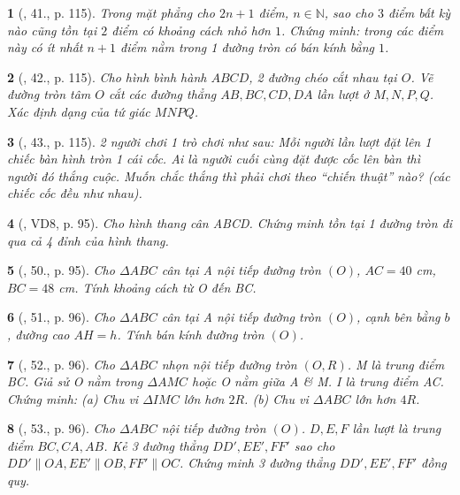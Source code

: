 \documentclass{article}
\newtheorem{baitoan}{}
\begin{document}
\begin{baitoan}[\cite{Tuyen_Toan_9_old}, 41., p. 115]
	Trong mặt phẳng cho $2n + 1$ điểm, $n\in\mathbb{N}$, sao cho $3$ điểm bất kỳ nào cũng tồn tại $2$ điểm có khoảng cách nhỏ hơn $1$. Chứng minh: trong các điểm này có ít nhất $n + 1$ điểm nằm trong 1 đường tròn có bán kính bằng $1$.
\end{baitoan}

\begin{baitoan}[\cite{Tuyen_Toan_9_old}, 42., p. 115]
	Cho hình bình hành $ABCD$, 2 đường chéo cắt nhau tại $O$. Vẽ đường tròn tâm $O$ cắt các đường thẳng $AB,BC,CD,DA$ lần lượt ở $M,N,P,Q$. Xác định dạng của tứ giác $MNPQ$.
\end{baitoan}

\begin{baitoan}[\cite{Tuyen_Toan_9_old}, 43., p. 115]
	2 người chơi 1 trò chơi như sau: Mỗi người lần lượt đặt lên 1 chiếc bàn hình tròn 1 cái cốc. Ai là người cuối cùng đặt được cốc lên bàn thì người đó thắng cuộc. Muốn chắc thắng thì phải chơi theo ``chiến thuật'' nào? (các chiếc cốc đều như nhau).
\end{baitoan}

\begin{baitoan}[\cite{Binh_Toan_9_tap_1}, VD8, p. 95]
	Cho hình thang cân ABCD. Chứng minh tồn tại 1 đường tròn đi qua cả 4 đỉnh của hình thang.
\end{baitoan}

\begin{baitoan}[\cite{Binh_Toan_9_tap_1}, 50., p. 95]
	Cho $\Delta ABC$ cân tại A nội tiếp đường tròn $(O)$, $AC = 40$ {\rm cm}, $BC = 48$ {\rm cm}. Tính khoảng cách từ O đến BC. 
\end{baitoan}

\begin{baitoan}[\cite{Binh_Toan_9_tap_1}, 51., p. 96]
	Cho $\Delta ABC$ cân tại A nội tiếp đường tròn $(O)$, cạnh bên bằng $b$, đường cao $AH = h$. Tính bán kính đường tròn $(O)$.
\end{baitoan}

\begin{baitoan}[\cite{Binh_Toan_9_tap_1}, 52., p. 96]
	Cho $\Delta ABC$ nhọn nội tiếp đường tròn $(O,R)$. M là trung điểm BC. Giả sử O nằm trong $\Delta AMC$ hoặc O nằm giữa A \& M. I là trung điểm AC. Chứng minh: (a) Chu vi $\Delta IMC$ lớn hơn $2R$. (b) Chu vi $\Delta ABC$ lớn hơn $4R$.
\end{baitoan}

\begin{baitoan}[\cite{Binh_Toan_9_tap_1}, 53., p. 96]
	Cho $\Delta ABC$ nội tiếp đường tròn $(O)$. $D,E,F$ lần lượt là trung điểm $BC,CA,AB$. Kẻ 3 đường thẳng $DD',EE',FF'$ sao cho $DD'\parallel OA,EE'\parallel OB,FF'\parallel OC$. Chứng minh 3 đường thẳng $DD',EE',FF'$ đồng quy.
\end{baitoan}
\end{document}
